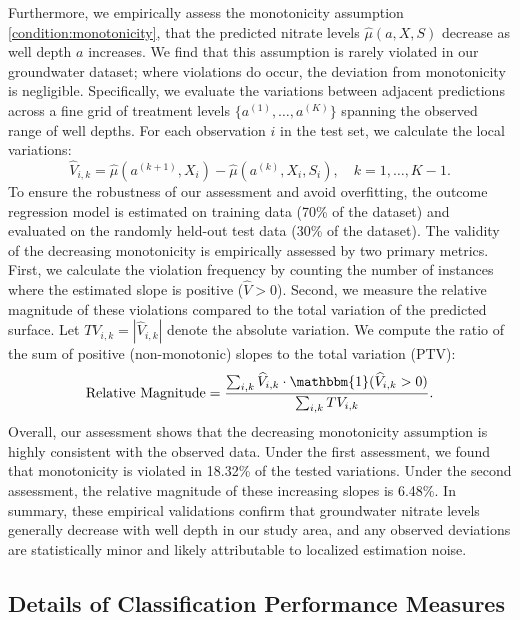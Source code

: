 \documentclass[12pt]{article}
\begin{document}
Furthermore, we empirically assess the monotonicity assumption \ref{condition:monotonicity}, that the predicted nitrate levels $\widehat{\mu}(a, X, S)$ decrease as well depth $a$ increases. We find that this assumption is rarely violated in our groundwater dataset; where violations do occur, the deviation from monotonicity is negligible. Specifically, we evaluate the variations between adjacent predictions across a fine grid of treatment levels $\{a^{(1)}, \dots, a^{(K)}\}$ spanning the observed range of well depths. For each observation $i$ in the test set, we calculate the local variations:$$\widehat{V}_{i,k} = \widehat{\mu}(a^{(k+1)}, X_i) - \widehat{\mu}(a^{(k)}, X_i,S_i), \quad k = 1, \dots, K-1.$$
To ensure the robustness of our assessment and avoid overfitting, the outcome regression model is estimated on training data (70\% of the dataset) and evaluated on the randomly held-out test data (30\% of the dataset). The validity of the decreasing monotonicity is empirically assessed by two primary metrics. First, we calculate the violation frequency by counting the number of instances where the estimated slope is positive ($\widehat{V} > 0$). Second, we measure the relative magnitude of these violations compared to the total variation of the predicted surface. Let $TV_{i,k} = |\widehat{V}_{i,k}|$ denote the absolute variation. We compute the ratio of the sum of positive (non-monotonic) slopes to the total variation (PTV):$$\text{Relative Magnitude} = \frac{\sum_{i,k} \widehat{V}_{i,k} \cdot \mathbbm{1}(\widehat{V}_{i,k} > 0)}{\sum_{i,k} TV_{i,k}}.$$Overall, our assessment shows that the decreasing monotonicity assumption is highly consistent with the observed data. Under the first assessment, we found that monotonicity is violated in 18.32\% of the tested variations. Under the second assessment, the relative magnitude of these increasing slopes is 6.48\%. In summary, these empirical validations confirm that groundwater nitrate levels generally decrease with well depth in our study area, and any observed deviations are statistically minor and likely attributable to localized estimation noise.

\subsection{Details of Classification Performance Measures
}\label{sec:binary_measure}
\end{document}
